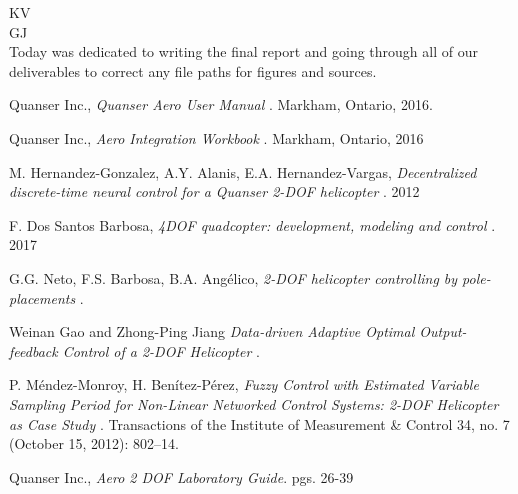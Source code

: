 \documentclass[fontsize=11pt, %
                             paper=letter, %
                             openany, %
                             captions=tableheading,
                             index=totoc,
                             hyperref]{labbook}
\begin{document}
\begin{addmargin}[0cm]{0cm}
KV\\


GJ\\
Today was dedicated to writing the final report and going through all of our deliverables to correct any file paths for figures and sources.




\end{addmargin}




% 


\begin{thebibliography}{9}

Quanser Inc.,
\emph{Quanser Aero User Manual }.
Markham, Ontario,
2016.

Quanser Inc.,
\emph{Aero Integration Workbook }.
Markham, Ontario,
2016

M. Hernandez-Gonzalez, A.Y. Alanis, E.A. Hernandez-Vargas,
\emph{Decentralized discrete-time neural control for a Quanser 2-DOF helicopter }.
2012

F. Dos Santos Barbosa,
\emph{4DOF quadcopter: development, modeling and control }.
2017

G.G. Neto, F.S. Barbosa, B.A. Ang\'{e}lico,
\emph{2-DOF helicopter controlling by pole-placements }.

Weinan Gao and Zhong-Ping Jiang
\emph{Data-driven Adaptive Optimal Output-feedback Control of a 2-DOF Helicopter }.

P. Méndez-Monroy, H. Benítez-Pérez,
\emph{Fuzzy Control with Estimated Variable Sampling Period for Non-Linear Networked Control Systems: 2-DOF Helicopter as Case Study }. 
Transactions of the Institute of Measurement \& Control 34, no. 7 (October 15, 2012): 802–14. 

Quanser Inc.,
\emph{Aero 2 DOF Laboratory Guide}.
pgs. 26-39 %


\end{thebibliography}

\end{document}
